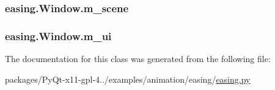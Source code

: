 \subsubsection[{m\+\_\+scene}]{\setlength{\rightskip}{0pt plus 5cm}easing.\+Window.\+m\+\_\+scene}\label{classeasing_1_1Window_ad9d6879b7f469b3d920f3cb9917e3d9a}
\hypertarget{classeasing_1_1Window_a671f45c4796a55834d65ee29f3bbfd46}{}
\subsubsection[{m\+\_\+ui}]{\setlength{\rightskip}{0pt plus 5cm}easing.\+Window.\+m\+\_\+ui}\label{classeasing_1_1Window_a671f45c4796a55834d65ee29f3bbfd46}


The documentation for this class was generated from the following file\+:\begin{DoxyCompactItemize}
\item 
packages/\+Py\+Qt-\/x11-\/gpl-\/4../examples/animation/easing/\hyperlink{easing_8py}{easing.\+py}\end{DoxyCompactItemize}
